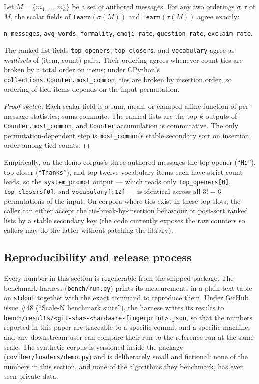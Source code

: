 \begin{proposition}
\label{prop:persona-invariance}
Let $M = \{m_1, \dots, m_k\}$ be a set of authored messages. For any two
orderings $\sigma, \tau$ of $M$, the scalar fields of
$\texttt{learn}(\sigma(M))$ and $\texttt{learn}(\tau(M))$ agree exactly:
\begin{center}
\texttt{n\_messages}, \texttt{avg\_words}, \texttt{formality},
\texttt{emoji\_rate}, \texttt{question\_rate}, \texttt{exclaim\_rate}.
\end{center}
The ranked-list fields \texttt{top\_openers}, \texttt{top\_closers}, and
\texttt{vocabulary} agree as \emph{multisets} of (item, count) pairs. Their
ordering agrees whenever count ties are broken by a total order on items;
under CPython's \texttt{collections.Counter.most\_common}, ties are broken by
insertion order, so ordering of tied items depends on the input permutation.
\end{proposition}
\begin{proof}[Proof sketch]
Each scalar field is a sum, mean, or clamped affine function of per-message
statistics; sums commute. The ranked lists are the top-$k$ outputs of
\texttt{Counter.most\_common}, and \texttt{Counter} accumulation is
commutative. The only permutation-dependent step is
\texttt{most\_common}'s stable secondary sort on insertion order among tied
counts.
\end{proof}

Empirically, on the demo corpus's three authored messages the top opener
(``\texttt{Hi}''), top closer (``\texttt{Thanks}''), and top twelve vocabulary
items each have strict count leads, so the \texttt{system\_prompt} output —
which reads only \texttt{top\_openers[0]}, \texttt{top\_closers[0]}, and
\texttt{vocabulary[:12]} — is identical across all $3! = 6$ permutations of
the input. On corpora where ties exist in these top slots, the caller can
either accept the tie-break-by-insertion behaviour or post-sort ranked lists
by a stable secondary key (the code currently exposes the raw counters so
callers may do the latter without patching the library).

\subsection{Reproducibility and release process}
\label{sec:eval-repro}

Every number in this section is regenerable from the shipped package. The
benchmark harness (\texttt{bench/run.py}) prints its measurements in a
plain-text table on \texttt{stdout} together with the exact command to reproduce
them. Under GitHub issue \#48 (``Scale-N benchmark suite''), the harness writes
its results to \texttt{bench/results/<git-sha>-<hardware-fingerprint>.json}, so
that the numbers reported in this paper are traceable to a specific commit and
a specific machine, and any downstream user can compare their run to the
reference run at the same scale. The synthetic corpus is versioned inside the
package (\texttt{coviber/loaders/demo.py}) and is deliberately small and
fictional: none of the numbers in this section, and none of the algorithms
they benchmark, has ever seen private data.
